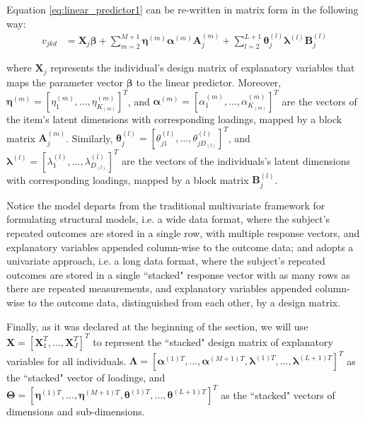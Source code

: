 Equation \ref{eq:linear_predictor1} can be re-written in matrix form in the following way:
\begin{equation} \label{eq:linear_predictor2}
	\begin{split}
		v_{jkd} &= \mathbf{X}_{j} \pmb{\beta} + \sum_{m=2}^{M+1} \pmb{\eta}^{(m)} \pmb{\alpha}^{(m)} \mathbf{A}_{j}^{(m)} + \sum_{l=2}^{L+1} \pmb{\theta}_{j}^{(l)} \pmb{\lambda}^{(l)} \mathbf{B}_{j}^{(l)}
	\end{split}
\end{equation}

\noindent where $\mathbf{X}_{j}$ represents the individual's design matrix of explanatory variables that maps the parameter vector $\pmb{\beta}$ to the linear predictor. Moreover, $\pmb{\eta}^{(m)} = [ \eta_{1}^{(m)}, \dots, \eta_{K_{(m)}}^{(m)} ]^{T}$, and  $\pmb{\alpha}^{(m)} = [ \alpha_{1}^{(m)}, \dots, \alpha_{K_{(m)}}^{(m)} ]^{T}$ are the vectors of the item's latent dimensions with corresponding loadings, mapped by a block matrix $\mathbf{A}_{j}^{(m)}$. Similarly, $\pmb{\theta}_{j}^{(l)} = [ \theta_{j1}^{(l)}, \dots, \theta_{jD_{(l)}}^{(l)} ]^{T}$, and  $\pmb{\lambda}^{(l)} = [ \lambda_{1}^{(l)}, \dots, \lambda_{D_{(l)}}^{(l)} ]^{T}$ are the vectors of the individuals's latent dimensions with corresponding loadings, mapped by a block matrix $\mathbf{B}_{j}^{(l)}$.

Notice the model departs from the traditional multivariate framework for formulating structural models, i.e. a wide data format, where the subject’s repeated outcomes are stored in a single row, with multiple response vectors, and explanatory variables appended column-wise to the outcome data; and adopts a univariate approach, i.e. a long data format, where the subject’s repeated outcomes are stored in a single ``stacked" response vector with as many rows as there are repeated measurements, and explanatory variables appended column-wise to the outcome data, distinguished from each other, by a design matrix. 

Finally, as it was declared at the beginning of the section, we will use $\mathbf{X} = [ \mathbf{X}_{1}^{T}, \dots, \mathbf{X}_{J}^{T} ]^{T}$ to represent the ``stacked" design matrix of explanatory variables for all individuals. $\pmb{\Lambda} = [ \pmb{\alpha}^{(1)T}, \dots, \pmb{\alpha}^{(M+1)T}, \pmb{\lambda}^{(1)T}, \dots, \pmb{\lambda}^{(L+1)T} ]^{T}$ as the ``stacked" vector of loadings, and $\pmb{\Theta} = [ \pmb{\eta}^{(1)T}, \dots, \pmb{\eta}^{(M+1)T}, \pmb{\theta}^{(1)T}, \dots, \pmb{\theta}^{(L+1)T} ]^{T}$ as the ``stacked" vectors of dimensions and sub-dimensions.



